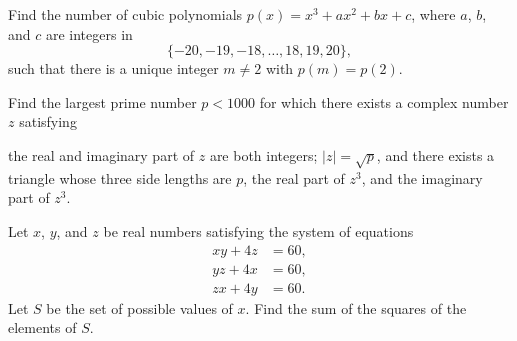 \documentclass[11pt]{article}
\theoremstyle{definition}
\begin{document}
\begin{question}[name={2023 AIME I, \href{https://artofproblemsolving.com/community/c4p27048835}{Problem 9}}]
	Find the number of cubic polynomials $p(x) = x^3 + ax^2 + bx + c$, where $a$, $b$, and $c$ are integers in $$\{-20, -19,-18, \dots , 18, 19, 20\},$$ such that there is a unique integer $m \neq 2$ with $p(m) = p(2)$.
\end{question}


%	









\begin{question}[name={2023 AIME I, \href{https://artofproblemsolving.com/community/c4p27048771}{Problem 15}}]
	Find the largest prime number $p<1000$ for which there exists a complex number $z$ satisfying
	\begin{tasks}
		\task the real and imaginary part of $z$ are both integers;
		\task $|z|=\sqrt{p}$, and
		\task there exists a triangle whose three side lengths are $p$, the real part of $z^{3}$, and the imaginary part of $z^{3}$.
	\end{tasks}
\end{question}





%	









\begin{question}[name={2023 AIME II, \href{https://artofproblemsolving.com/community/c4p27101498}{Problem 2}}]
	Let $x$, $y$, and $z$ be real numbers satisfying the system of equations
	\begin{align*}
		xy+4z&=60,\\
		yz+4x&=60,\\
		zx+4y&=60.
	\end{align*}Let $S$ be the set of possible values of $x$. Find the sum of the squares of the elements of $S$.
\end{question}
\end{document}
